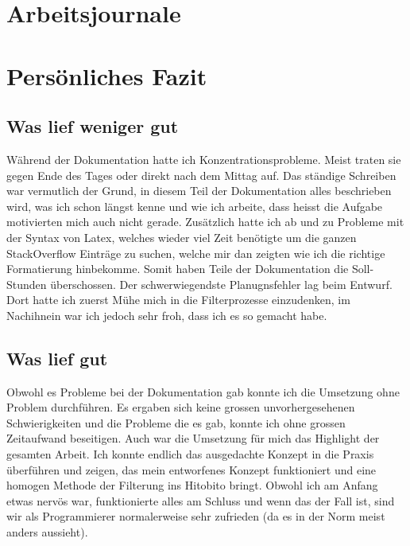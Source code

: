 

\chapter{Arbeitsjournale}







\chapter{Persönliches Fazit}

\section{Was lief weniger gut}
Während der Dokumentation hatte ich Konzentrationsprobleme. Meist traten sie gegen Ende des Tages oder direkt
nach dem Mittag auf. Das ständige Schreiben war vermutlich der Grund, in diesem Teil der Dokumentation alles beschrieben wird,
was ich schon längst kenne und wie ich arbeite, dass heisst die Aufgabe motivierten mich auch nicht gerade. Zusätzlich hatte ich ab und zu
Probleme mit der Syntax von Latex, welches wieder viel Zeit benötigte um die ganzen StackOverflow Einträge zu suchen, welche mir dan zeigten wie
ich die richtige Formatierung hinbekomme. Somit haben Teile der Dokumentation die Soll-Stunden überschossen. Der schwerwiegendste Planugnsfehler lag beim Entwurf.
Dort hatte ich zuerst Mühe mich in die Filterprozesse einzudenken, im Nachihnein war ich jedoch sehr froh, dass ich es so gemacht habe.

\section{Was lief gut}
Obwohl es Probleme bei der Dokumentation gab konnte ich die Umsetzung ohne Problem durchführen. Es ergaben sich keine grossen unvorhergesehenen Schwierigkeiten
und die Probleme die es gab, konnte ich ohne grossen Zeitaufwand beseitigen. Auch war die Umsetzung für mich das Highlight der gesamten Arbeit. 
Ich konnte endlich das ausgedachte Konzept in die Praxis überführen und zeigen, das mein entworfenes Konzept funktioniert und eine homogen Methode der
Filterung ins Hitobito bringt. Obwohl ich am Anfang etwas nervös war, funktionierte alles am Schluss und wenn das der Fall ist, sind wir als
Programmierer normalerweise sehr zufrieden (da es in der Norm meist anders aussieht).

